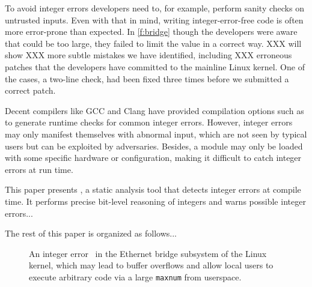 To avoid integer errors developers need to, for example, perform
sanity checks on untrusted inputs.  Even with that in mind, writing
integer-error-free code is often more error-prone than expected.
In \autoref{f:bridge} though the developers were aware that 
could be too large, they failed to limit the value in a correct
way.  XXX will show XXX more subtle mistakes we have identified,
including XXX erroneous patches that the developers have committed
to the mainline Linux kernel.  One of the cases, a two-line check,
had been fixed three times before we submitted a correct patch.

Decent compilers like GCC and Clang have provided compilation
options such as  to generate runtime checks for common
integer errors.  However, integer errors may only manifest themselves
with abnormal input, which are not seen by typical users but can
be exploited by adversaries.  Besides, a module may only be loaded
with some specific hardware or configuration, making it difficult
to catch integer errors at run time.

This paper presents \sys, a static analysis tool that detects integer
errors at compile time.  It performs precise bit-level reasoning
of integers and warns possible integer errors...

The rest of this paper is organized as follows...

\begin{figure}

\caption{An integer error~\cite[CVE-2006-5751]{cve} in the Ethernet
bridge subsystem of the Linux kernel, which may lead to buffer
overflows and allow local users to execute arbitrary code via a
large \texttt{maxnum} from userspace.}
\label{f:bridge}
\end{figure}
